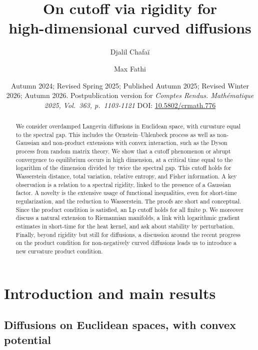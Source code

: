 \documentclass[10pt,reqno]{amsart}
\title[On cutoff via rigidity for high-dimensional curved diffusions]{On cutoff via rigidity for\\high-dimensional curved diffusions}
\date{Autumn 2024; Revised Spring 2025; Published Autumn 2025; Revised Winter
  2026; Autumn 2026. Postpublication version for \emph{Comptes Rendus.
    Mathématique 2025, Vol.~363, p.~1103-1121} DOI:
  \href{https://doi.org/10.5802/crmath.776}{10.5802/crmath.776}}
\author{Djalil Chafaï}
{\footnotesize\address[DC]{DMA, École normale supérieure, 45 rue d'Ulm, 75230, Paris; and CEREMADE, Université Paris-Dauphine, Place du Maréchal de Lattre de Tassigny, 75775, Paris; PSL, CNRS}}
\author{Max Fathi}
{\footnotesize\address[MF]{Université Paris Cité and Sorbonne Université, CNRS, Laboratoire Jacques-Louis Lions and Laboratoire de Probabilités, Statistique et Modélisation, F-75013 Paris, France\\
and DMA, École normale supérieure, Université PSL, CNRS, 75005 Paris, France \\
and Institut Universitaire de France}}
\numberwithin{equation}{section}
\begin{document}
\begin{abstract}
  We consider overdamped Langevin diffusions in Euclidean space, with
  curvature equal to the spectral gap. This includes the
  Ornstein--Uhlenbeck process as well as non-Gaussian and non-product
  extensions with convex interaction, such as the Dyson process from random
  matrix theory. We show that a cutoff phenomenon or abrupt convergence to
  equilibrium occurs in high dimension, at a critical time equal to the
  logarithm of the dimension divided by twice the spectral gap. This cutoff
  holds for Wasserstein distance, total variation, relative entropy, and
  Fisher information. A key observation is a relation to a spectral rigidity,
  linked to the presence of a Gaussian factor. A novelty is the extensive
  usage of functional inequalities, even for short-time regularization, and
  the reduction to Wasserstein. The proofs are short and conceptual. Since the
  product condition is satisfied, an Lp cutoff holds for all finite p. We moreover
  discuss a natural extension to Riemannian manifolds, a link with logarithmic
  gradient estimates in short-time for the heat kernel, and ask about
  stability by perturbation. Finally, beyond rigidity but still for
  diffusions, a discussion around the recent progress on the product condition
  for non-negatively curved diffusions leads us to introduce a new curvature
  product condition.
\end{abstract}

\maketitle

{\footnotesize\tableofcontents}

\section{Introduction and main results}

\subsection{Diffusions on Euclidean spaces, with convex potential}
\end{document}
